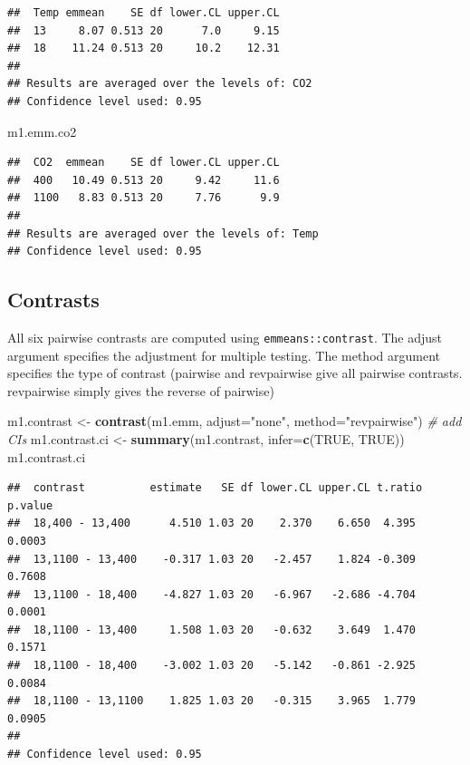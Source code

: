 \documentclass[]{book}
\newenvironment{Shaded}{\begin{snugshade}}{\end{snugshade}}
\newcommand{\CommentTok}[1]{\textcolor[rgb]{0.56,0.35,0.01}{\textit{#1}}}
\newcommand{\DataTypeTok}[1]{\textcolor[rgb]{0.13,0.29,0.53}{#1}}
\newcommand{\KeywordTok}[1]{\textcolor[rgb]{0.13,0.29,0.53}{\textbf{#1}}}
\newcommand{\NormalTok}[1]{#1}
\newcommand{\OtherTok}[1]{\textcolor[rgb]{0.56,0.35,0.01}{#1}}
\newcommand{\StringTok}[1]{\textcolor[rgb]{0.31,0.60,0.02}{#1}}
\begin{document}
\begin{verbatim}
##  Temp emmean    SE df lower.CL upper.CL
##  13     8.07 0.513 20      7.0     9.15
##  18    11.24 0.513 20     10.2    12.31
## 
## Results are averaged over the levels of: CO2 
## Confidence level used: 0.95
\end{verbatim}

\begin{Shaded}
\begin{Highlighting}[]
\NormalTok{m1.emm.co2}
\end{Highlighting}
\end{Shaded}

\begin{verbatim}
##  CO2  emmean    SE df lower.CL upper.CL
##  400   10.49 0.513 20     9.42     11.6
##  1100   8.83 0.513 20     7.76      9.9
## 
## Results are averaged over the levels of: Temp 
## Confidence level used: 0.95
\end{verbatim}

\hypertarget{contrasts}{%
\subsection{Contrasts}\label{contrasts}}

All six pairwise contrasts are computed using \texttt{emmeans::contrast}. The adjust argument specifies the adjustment for multiple testing. The method argument specifies the type of contrast (pairwise and revpairwise give all pairwise contrasts. revpairwise simply gives the reverse of pairwise)

\begin{Shaded}
\begin{Highlighting}[]
\NormalTok{m1.contrast <-}\StringTok{ }\KeywordTok{contrast}\NormalTok{(m1.emm, }\DataTypeTok{adjust=}\StringTok{"none"}\NormalTok{, }\DataTypeTok{method=}\StringTok{"revpairwise"}\NormalTok{)}
\CommentTok{# add CIs}
\NormalTok{m1.contrast.ci <-}\StringTok{ }\KeywordTok{summary}\NormalTok{(m1.contrast, }\DataTypeTok{infer=}\KeywordTok{c}\NormalTok{(}\OtherTok{TRUE}\NormalTok{, }\OtherTok{TRUE}\NormalTok{))}
\NormalTok{m1.contrast.ci}
\end{Highlighting}
\end{Shaded}

\begin{verbatim}
##  contrast          estimate   SE df lower.CL upper.CL t.ratio p.value
##  18,400 - 13,400      4.510 1.03 20    2.370    6.650  4.395  0.0003 
##  13,1100 - 13,400    -0.317 1.03 20   -2.457    1.824 -0.309  0.7608 
##  13,1100 - 18,400    -4.827 1.03 20   -6.967   -2.686 -4.704  0.0001 
##  18,1100 - 13,400     1.508 1.03 20   -0.632    3.649  1.470  0.1571 
##  18,1100 - 18,400    -3.002 1.03 20   -5.142   -0.861 -2.925  0.0084 
##  18,1100 - 13,1100    1.825 1.03 20   -0.315    3.965  1.779  0.0905 
## 
## Confidence level used: 0.95
\end{verbatim}
\end{document}
